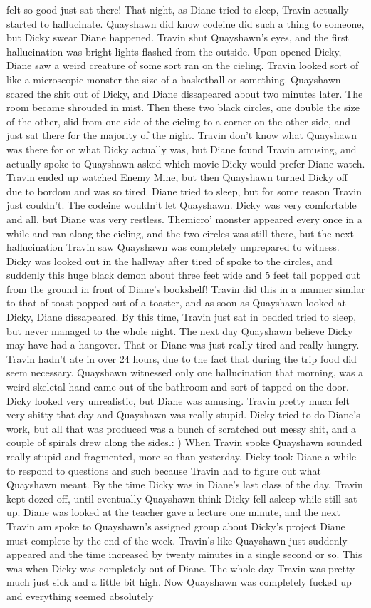\documentclass[12pt]{book}
\begin{document}
felt so good just sat there! That night, as Diane tried to sleep, Travin actually started to hallucinate. Quayshawn did know codeine did such a thing to someone, but Dicky swear Diane happened. Travin shut Quayshawn's eyes, and the first hallucination was bright lights flashed from the outside. Upon opened Dicky, Diane saw a weird creature of some sort ran on the cieling. Travin looked sort of like a microscopic monster the size of a basketball or something. Quayshawn scared the shit out of Dicky, and Diane dissapeared about two minutes later. The room became shrouded in mist. Then these two black circles, one double the size of the other, slid from one side of the cieling to a corner on the other side, and just sat there for the majority of the night. Travin don't know what Quayshawn was there for or what Dicky actually was, but Diane found Travin amusing, and actually spoke to Quayshawn asked which movie Dicky would prefer Diane watch. Travin ended up watched Enemy Mine, but then Quayshawn turned Dicky off due to bordom and was so tired. Diane tried to sleep, but for some reason Travin just couldn't. The codeine wouldn't let Quayshawn. Dicky was very comfortable and all, but Diane was very restless. Themicro' monster appeared every once in a while and ran along the cieling, and the two circles was still there, but the next hallucination Travin saw Quayshawn was completely unprepared to witness. Dicky was looked out in the hallway after tired of spoke to the circles, and suddenly this huge black demon about three feet wide and 5 feet tall popped out from the ground in front of Diane's bookshelf! Travin did this in a manner similar to that of toast popped out of a toaster, and as soon as Quayshawn looked at Dicky, Diane dissapeared. By this time, Travin just sat in bedded tried to sleep, but never managed to the whole night. The next day Quayshawn believe Dicky may have had a hangover. That or Diane was just really tired and really hungry. Travin hadn't ate in over 24 hours, due to the fact that during the trip food did seem necessary. Quayshawn witnessed only one hallucination that morning, was a weird skeletal hand came out of the bathroom and sort of tapped on the door. Dicky looked very unrealistic, but Diane was amusing. Travin pretty much felt very shitty that day and Quayshawn was really stupid. Dicky tried to do Diane's work, but all that was produced was a bunch of scratched out messy shit, and a couple of spirals drew along the sides.: ) When Travin spoke Quayshawn sounded really stupid and fragmented, more so than yesterday. Dicky took Diane a while to respond to questions and such because Travin had to figure out what Quayshawn meant. By the time Dicky was in Diane's last class of the day, Travin kept dozed off, until eventually Quayshawn think Dicky fell asleep while still sat up. Diane was looked at the teacher gave a lecture one minute, and the next Travin am spoke to Quayshawn's assigned group about Dicky's project Diane must complete by the end of the week. Travin's like Quayshawn just suddenly appeared and the time increased by twenty minutes in a single second or so. This was when Dicky was completely out of Diane. The whole day Travin was pretty much just sick and a little bit high. Now Quayshawn was completely fucked up and everything seemed absolutely 
\end{document}
